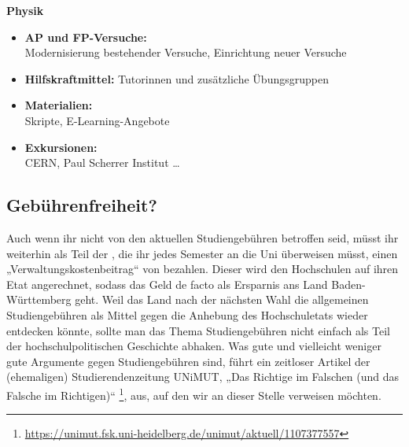 \noindent\textbf{Physik}
\begin{itemize}
	\item \textbf{\gls{AP} und \gls{FP}-Versuche:}\\
	      Modernisierung bestehender Versuche, Einrichtung neuer Versuche
	\item \textbf{Hilfskraftmittel:}
	      Tutorinnen und zusätzliche Übungsgruppen
	\item \textbf{Materialien:}\\
	      Skripte, E-Learning-Angebote
	\item \textbf{Exkursionen:}\\
	      CERN, Paul Scherrer Institut \dots
\end{itemize}


\subsection{Gebührenfreiheit?}
Auch wenn ihr nicht von den aktuellen Studiengebühren betroffen seid, müsst ihr weiterhin als Teil der \EUR{\beitragssumme}, die ihr jedes Semester an die Uni überweisen müsst, einen „Verwaltungskostenbeitrag“ von \EUR{\verwaltungsbetrag} bezahlen. Dieser wird den Hochschulen auf ihren Etat angerechnet, sodass das Geld de facto als Ersparnis ans Land Baden-Württemberg geht. Weil das Land nach der nächsten Wahl die allgemeinen Studiengebühren als Mittel gegen die Anhebung des Hochschuletats wieder entdecken könnte, sollte man das Thema Studiengebühren nicht einfach als Teil der hochschulpolitischen Geschichte abhaken. Was gute und vielleicht weniger gute Argumente gegen Studiengebühren sind, führt ein zeitloser Artikel der (ehemaligen) Studierendenzeitung UNiMUT, „Das Richtige im Falschen (und das Falsche im Richtigen)“  \footnote{\url{https://unimut.fsk.uni-heidelberg.de/unimut/aktuell/1107377557}}, aus, auf den wir an dieser Stelle verweisen möchten.
